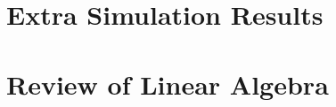 \documentclass[12pt]{report}
\begin{document}

\appendix

\chapter{Extra Simulation Results}

\chapter{Review of Linear Algebra}
\end{document}
